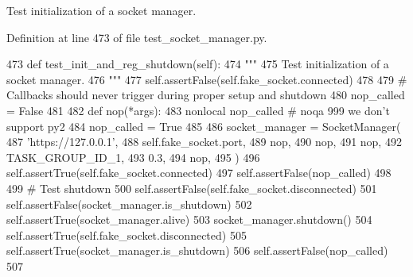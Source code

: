 \begin{DoxyVerb}Test initialization of a socket manager.
\end{DoxyVerb}
 

Definition at line 473 of file test\+\_\+socket\+\_\+manager.\+py.


\begin{DoxyCode}
473     \textcolor{keyword}{def }test\_init\_and\_reg\_shutdown(self):
474         \textcolor{stringliteral}{"""}
475 \textcolor{stringliteral}{        Test initialization of a socket manager.}
476 \textcolor{stringliteral}{        """}
477         self.assertFalse(self.fake\_socket.connected)
478 
479         \textcolor{comment}{# Callbacks should never trigger during proper setup and shutdown}
480         nop\_called = \textcolor{keyword}{False}
481 
482         \textcolor{keyword}{def }nop(*args):
483             nonlocal nop\_called  \textcolor{comment}{# noqa 999 we don't support py2}
484             nop\_called = \textcolor{keyword}{True}
485 
486         socket\_manager = SocketManager(
487             \textcolor{stringliteral}{'https://127.0.0.1'},
488             self.fake\_socket.port,
489             nop,
490             nop,
491             nop,
492             TASK\_GROUP\_ID\_1,
493             0.3,
494             nop,
495         )
496         self.assertTrue(self.fake\_socket.connected)
497         self.assertFalse(nop\_called)
498 
499         \textcolor{comment}{# Test shutdown}
500         self.assertFalse(self.fake\_socket.disconnected)
501         self.assertFalse(socket\_manager.is\_shutdown)
502         self.assertTrue(socket\_manager.alive)
503         socket\_manager.shutdown()
504         self.assertTrue(self.fake\_socket.disconnected)
505         self.assertTrue(socket\_manager.is\_shutdown)
506         self.assertFalse(nop\_called)
507 
\end{DoxyCode}
\mbox{\label{classparlai_1_1mturk_1_1core_1_1test_1_1test__socket__manager_1_1TestSocketManagerSetupAndFunctions_a3195b9685afde3d96d5d1e6a2cf625a4}} 
